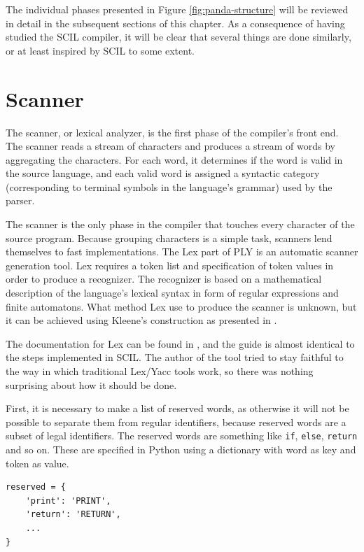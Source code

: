 The individual phases presented in Figure \ref{fig:panda-structure} will be reviewed in detail in the subsequent sections of this chapter. As a consequence of having studied the SCIL compiler, it will be clear that several things are done similarly, or at least inspired by SCIL to some extent. 

\section{Scanner}
The scanner, or lexical analyzer, is the first phase of the compiler's front end. The scanner reads a stream of characters and produces a stream of words by aggregating the characters. For each word, it determines if the word is valid in the source language, and each valid word is assigned a syntactic category (corresponding to terminal symbols in the language's grammar) used by the parser. 

The scanner is the only phase in the compiler that touches every character of the source program. Because grouping characters is a simple task, scanners lend themselves to fast implementations. The Lex part of PLY is an automatic scanner generation tool. Lex requires a token list and specification of token values in order to produce a recognizer. The recognizer is based on a mathematical description of the language's lexical syntax in form of regular expressions and finite automatons. What method Lex use to produce the scanner is unknown, but it can be achieved using Kleene's construction as presented in \cite[45]{EnginneringACompiler}.

The documentation for Lex can be found in \cite[section 4][]{ply}, and the guide is almost identical to the steps implemented in SCIL. The author of the tool tried to stay faithful to the way in which traditional Lex/Yacc tools work, so there was nothing surprising about how it should be done.

First, it is necessary to make a list of reserved words, as otherwise it will not be possible to separate them from regular identifiers, because reserved words are a subset of legal identifiers. The reserved words are something like \texttt{if}, \texttt{else}, \texttt{return} and so on. These are specified in Python using a dictionary with word as key and token as value.

\begin{verbatim}
reserved = {
    'print': 'PRINT',
    'return': 'RETURN',
    ...
}
\end{verbatim}

